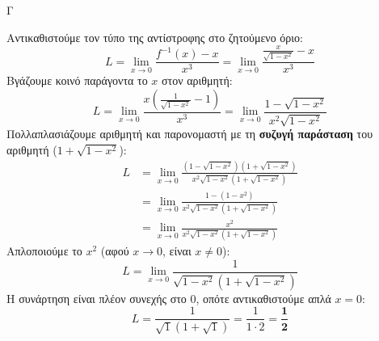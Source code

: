 \begin{thema}{Γ}
\begin{erwthma}
\item Αντικαθιστούμε τον τύπο της αντίστροφης στο ζητούμενο όριο:
\[ L = \lim_{x \to 0} \frac{f^{-1}(x) - x}{x^3} = \lim_{x \to 0} \frac{\frac{x}{\sqrt{1-x^2}} - x}{x^3} \]
Βγάζουμε κοινό παράγοντα το $x$ στον αριθμητή:
\[ L = \lim_{x \to 0} \frac{x \left( \frac{1}{\sqrt{1-x^2}} - 1 \right)}{x^3} = \lim_{x \to 0} \frac{1 - \sqrt{1-x^2}}{x^2 \sqrt{1-x^2}} \]
Πολλαπλασιάζουμε αριθμητή και παρονομαστή με τη \textbf{συζυγή παράσταση} του αριθμητή ($1 + \sqrt{1-x^2}$):
\begin{align*}
L &= \lim_{x \to 0} \frac{(1 - \sqrt{1-x^2})(1 + \sqrt{1-x^2})}{x^2 \sqrt{1-x^2} (1 + \sqrt{1-x^2})} \\
&= \lim_{x \to 0} \frac{1 - (1-x^2)}{x^2 \sqrt{1-x^2} (1 + \sqrt{1-x^2})} \\
&= \lim_{x \to 0} \frac{x^2}{x^2 \sqrt{1-x^2} (1 + \sqrt{1-x^2})}
\end{align*}
Απλοποιούμε το $x^2$ (αφού $x \to 0$, είναι $x \neq 0$):
\[ L = \lim_{x \to 0} \frac{1}{\sqrt{1-x^2} (1 + \sqrt{1-x^2})} \]
Η συνάρτηση είναι πλέον συνεχής στο 0, οπότε αντικαθιστούμε απλά $x = 0$:
\[ L = \frac{1}{\sqrt{1} (1 + \sqrt{1})} = \frac{1}{1 \cdot 2} = \boldsymbol{\frac{1}{2}} \]
\end{erwthma}
\end{thema}

